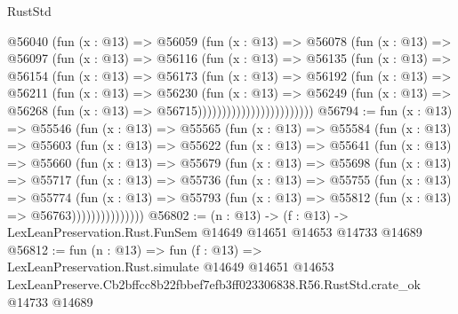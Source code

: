 \begin{lexlean}{RustStd}
\begin{coremodule}
                        @56040
                          (fun (x : @13) =>
                          @56059
                            (fun (x : @13) =>
                            @56078
                              (fun (x : @13) =>
                              @56097
                                (fun (x : @13) =>
                                @56116
                                  (fun (x : @13) =>
                                  @56135
                                    (fun (x : @13) =>
                                    @56154
                                      (fun (x : @13) =>
                                      @56173
                                        (fun (x : @13) =>
                                        @56192
                                          (fun (x : @13) =>
                                          @56211
                                            (fun (x : @13) =>
                                            @56230
                                              (fun (x : @13) =>
                                              @56249
                                                (fun (x : @13) =>
                                                @56268
                                                  (fun (x : @13) => @56715))))))))))))))))))))))))
@56794 := fun (x : @13) =>
  @55546
    (fun (x : @13) =>
    @55565
      (fun (x : @13) =>
      @55584
        (fun (x : @13) =>
        @55603
          (fun (x : @13) =>
          @55622
            (fun (x : @13) =>
            @55641
              (fun (x : @13) =>
              @55660
                (fun (x : @13) =>
                @55679
                  (fun (x : @13) =>
                  @55698
                    (fun (x : @13) =>
                    @55717
                      (fun (x : @13) =>
                      @55736
                        (fun (x : @13) =>
                        @55755
                          (fun (x : @13) =>
                          @55774
                            (fun (x : @13) =>
                            @55793 (fun (x : @13) => @55812 (fun (x : @13) => @56763)))))))))))))))
@56802 := (n : @13) ->
  (f : @13) -> LexLeanPreservation.Rust.FunSem @14649 @14651 @14653 @14733 @14689
@56812 := fun (n : @13) =>
  fun (f : @13) =>
  LexLeanPreservation.Rust.simulate
    @14649
    @14651
    @14653
    LexLeanPreserve.Cb2bffcc8b22fbbef7efb3ff023306838.R56.RustStd.crate_ok
    @14733
    @14689
\end{coremodule}
\end{lexlean}
